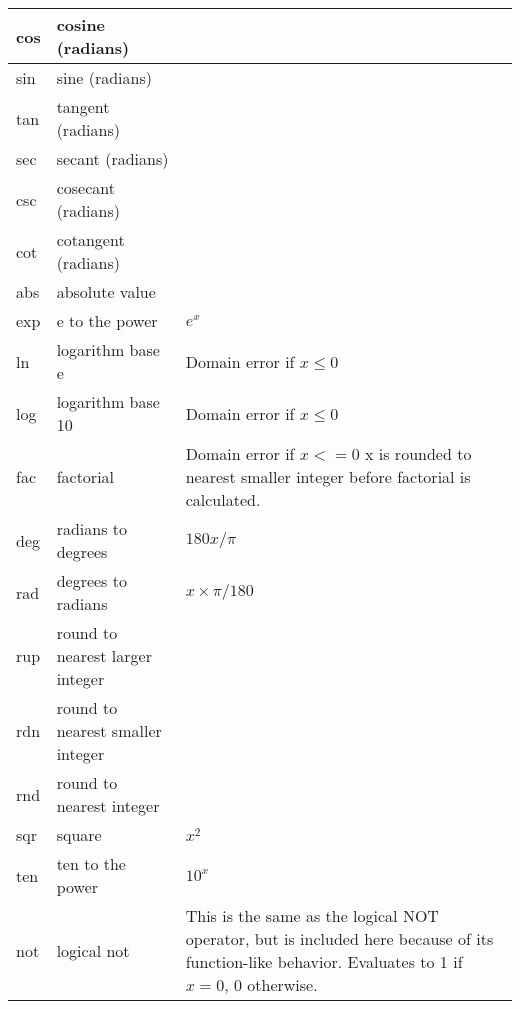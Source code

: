 \begin{longtable}{|l|p{1.3in}|p{2.5in}|}
cos & cosine (radians) & \\ \hline 
sin & sine (radians) & \\ \hline 
tan & tangent (radians) & \\ \hline 
sec & secant (radians) & \\ \hline 
csc & cosecant (radians) & \\ \hline 
cot & cotangent (radians) & \\ \hline 
abs & absolute value & \\ \hline 
exp & e to the power &  $e^x$\\ \hline 
ln & logarithm base e & Domain error if $x \leq 0$\\ \hline 
log & logarithm base 10 & Domain error if $x \leq 0$\\ \hline 
fac & factorial & Domain error if $x <= 0$ 
x is rounded to nearest smaller integer before factorial is calculated.\\ \hline 
deg & radians to degrees & $180 x /\pi$ \\ \hline 
rad & degrees to radians & $x\times\pi /180$ \\ \hline 
rup & round to nearest larger integer & \\ \hline 
rdn & round to nearest smaller integer & \\ \hline 
rnd & round to nearest integer & \\ \hline 
sqr & square & $x^2$\\ \hline 
ten & ten to the power & $10^x$\\ \hline 
not & logical not & This is the same as the logical NOT operator, but
is included here because of its function-like behavior. Evaluates to 1
if $x = 0$, 0 otherwise.\\ \hline 
\end{longtable}



